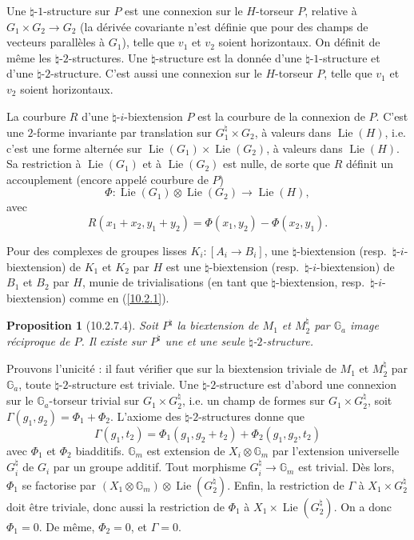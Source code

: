 \documentclass[12pt,a4paper]{amsart}
\theoremstyle{plain}
\newtheorem{proposition}[lemme]{Proposition}
\theoremstyle{definition}
\theoremstyle{remark}
\DeclareMathOperator{\Lie}{Lie}
\numberwithin{equation}{section}
\begin{document}
Une $\natural$-$1$-structure sur $P$ est une connexion sur le $H$-torseur $P$, relative à $G_1\times G_2\to G_2$ (la dérivée covariante n'est définie que pour des champs de vecteurs parallèles à $G_1$), telle que $v_1$ et $v_2$ soient horizontaux. On définit de même les $\natural$-$2$-structures. Une $\natural$-structure est la donnée d'une $\natural$-$1$-structure et d'une $\natural$-$2$-structure. C'est aussi une connexion sur le $H$-torseur $P$, telle que $v_1$ et $v_2$ soient horizontaux.

La courbure $R$ d'une $\natural$-$i$-biextension $P$ est la courbure de la connexion de $P$. C'est une $2$-forme invariante par translation sur $G_1^\natural\times G_2$, à valeurs dans $\Lie(H)$, i.e. c'est une forme alternée sur $\Lie(G_1)\times\Lie(G_2)$, à valeurs dans $\Lie(H)$. Sa restriction à $\Lie(G_1)$ et à $\Lie(G_2)$ est nulle, de sorte que $R$ définit un accouplement (encore appelé courbure de $P$)
\begin{equation}\label{eq:10.2.7.3}
\Phi:\Lie(G_1)\otimes\Lie(G_2)\to\Lie(H),
\end{equation}
avec
\[
R(x_1+x_2,y_1+y_2)=\Phi(x_1,y_2)-\Phi(x_2,y_1).
\]

Pour des complexes de groupes lisses $K_i:[A_i\to B_i]$, une $\natural$-biextension (resp.~$\natural$-$i$-biextension) de $K_1$ et $K_2$ par $H$ est une $\natural$-biextension (resp.~$\natural$-$i$-biextension) de $B_1$ et $B_2$ par $H$, munie de trivialisations (en tant que $\natural$-biextension, resp.~$\natural$-$i$-biextension) comme en (\ref{10.2.1}).

\begin{proposition}[10.2.7.4]\label{prop:10.2.7.4}
Soit $P^\natural$ la biextension de $M_1$ et $M_2^\natural$ par $\mathbb{G}_a$ image réciproque de $P$. Il existe sur $P^\natural$ une et une seule $\natural$-$2$-structure.
\end{proposition}

Prouvons l'unicité : il faut vérifier que sur la biextension triviale de $M_1$ et $M_2^\natural$ par $\mathbb{G}_a$, toute $\natural$-$2$-structure est triviale. Une $\natural$-$2$-structure est d'abord une connexion sur le $\mathbb{G}_a$-torseur trivial sur $G_1\times G_2^\natural$, i.e. un champ de formes sur $G_1\times G_2^\natural$, soit $\Gamma(g_1,g_2)=\Phi_1+\Phi_2$. L'axiome des $\natural$-$2$-structures donne que
\[
\Gamma(g_1,t_2)=\Phi_1(g_1,g_2+t_2)+\Phi_2(g_1,g_2,t_2)
\]
avec $\Phi_1$ et $\Phi_2$ biadditifs. $\mathbb{G}_m$ est extension de $X_i\otimes\mathbb{G}_m$ par l'extension universelle $G_i^\natural$ de $G_i$ par un groupe additif. Tout morphisme $G_i^\natural\to\mathbb{G}_m$ est trivial. Dès lors, $\Phi_1$ se factorise par $(X_1\otimes\mathbb{G}_m)\otimes\Lie(G_2^\natural)$. Enfin, la restriction de $\Gamma$ à $X_1\times G_2^\natural$ doit être triviale, donc aussi la restriction de $\Phi_1$ à $X_1\times\Lie(G_2^\natural)$. On a donc $\Phi_1=0$. De même, $\Phi_2=0$, et $\Gamma=0$.
\end{document}
